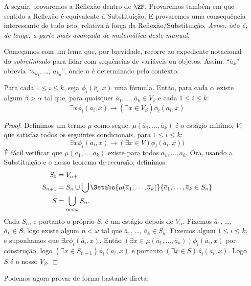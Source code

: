 \documentclass[../../../include/open-logic-section]{subfiles}
\begin{document}

A seguir, provaremos a Reflexão dentro de $\ZF$. Provaremos também
em que sentido a Reflexão é equivalente à Substituição. E
provaremos uma consequência interessante de tudo isto, relativa à
força da Reflexão/Substituição. \emph{Aviso: isto é, de longe, a parte mais avançada de matemática deste manual.} 

Começamos com um lema que, por brevidade, recorre ao expediente notacional
do \emph{sobrelinhado} para lidar com sequências de variáveis ou
objetos. Assim: ``$\overline{a}_k$'' abrevia ``$a_{k_1}$, \dots,
$a_{k_n}$'', onde $n$ é determinado pelo contexto.

\begin{lem}
Para cada $1 \leq i \leq k$, seja $\phi_i(\overline{v}_i, x)$ uma
fórmula. Então, para cada $\alpha$
existe algum $\beta > \alpha$ tal que, para quaisquer $\overline{a}_1,
\ldots, \overline{a}_k \in V_\beta$ e cada $1 \leq i \leq k$:
\[
	\exists x\phi_i(\overline{a}_i, x) \rightarrow (\exists x \in V_\beta) \phi_i(\overline{a}_i, x)
\]
\end{lem}

\begin{proof}
Definimos um termo $\mu$ como segue: $\mu(\overline{a}_1, \ldots,
\overline{a}_k)$ é o estágio mínimo, $V$, que satisfaz todos os
seguintes condicionais, para $1 \leq i \leq k$:
\[
\exists x\phi_i(\overline{a}_i, x) \rightarrow (\exists x \in V) \phi_i(\overline{a}_i, x))
\]
É fácil verificar que $\mu(\overline{a}_1, \ldots, \overline{a}_k)$ existe para todos $\overline{a}_1, \ldots, \overline{a}_k$. Ora, usando a Substituição e o nosso teorema de recursão, definimos:
\begin{align*}
	S_0 & = V_{\alpha+1}\\
	S_{n+1} & = S_n \cup \bigcup
	\Setabs{\mu(\overline{a}_1, \ldots, \overline{a}_k)}
	{\overline{a}_1, \ldots, \overline{a}_k \in S_n} \\
	S &= \bigcup_{m < \omega} S_n.
\end{align*}
Cada $S_n$, e portanto o próprio $S$, é um estágio depois de $V_\alpha$. Fixemos
$\overline{a}_1$, \dots,~$\overline{a}_k \in S$; logo existe algum $n <
\omega$ tal que $\overline{a}_1$, \dots, $\overline{a}_k \in S_n$.
Fixemos algum $1 \leq i \leq k$, e suponhamos que $\exists x
\phi_i(\overline{a}_i,x)$. Então $(\exists x \in \mu(\overline{a}_1,
\ldots, \overline{a}_k))\phi_i(\overline{a}_i, x)$ por construção, logo
$(\exists x \in S_{n+1})\phi_i(\overline{a}_i, x)$ e portanto
$(\exists x \in S)\phi_i(\overline{a}_i, x)$. Logo $S$ é o nosso $V_\beta$.
\end{proof}
\noindent 
Podemos agora provar  de
forma bastante direta:
\end{document}
